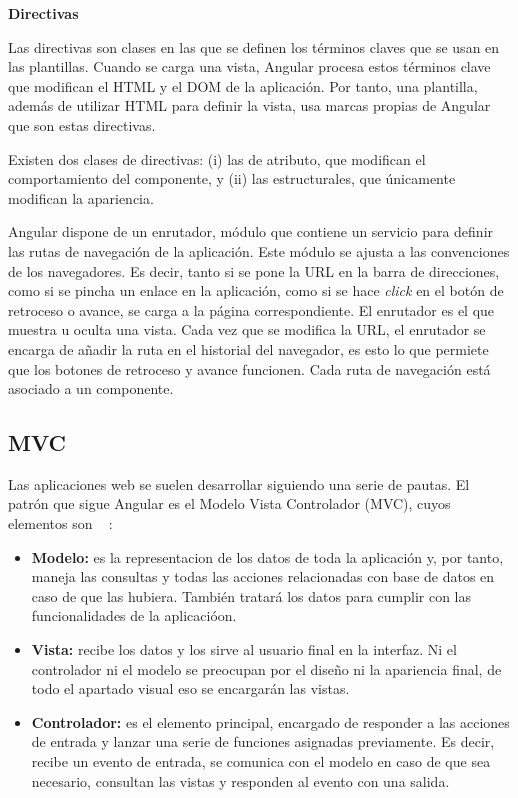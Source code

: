 \documentclass[a4paper, 12pt]{book}
\begin{document}
\textbf{Directivas}

Las directivas son clases en las que se definen los términos claves que se usan en las plantillas. Cuando se carga una vista, Angular procesa estos términos clave que modifican el HTML y el DOM de la aplicación. Por tanto, una plantilla, además de utilizar HTML para definir la vista, usa marcas propias de Angular que son estas directivas. 

Existen dos clases de directivas: (i) las de atributo, que modifican el comportamiento del componente, y (ii) las estructurales, que únicamente modifican la apariencia. 

Angular dispone de un enrutador, módulo que contiene un servicio para definir las rutas de navegación de la aplicación. Este módulo se ajusta a las convenciones de los navegadores. Es decir, tanto si se pone la URL en la barra de direcciones, como si se pincha un enlace en la aplicación, como si se hace \emph{click} en el botón de retroceso o avance, se carga a la página correspondiente. El enrutador es el que muestra u oculta una vista. Cada vez que se modifica la URL, el enrutador se encarga de añadir la ruta en el historial del navegador, es esto lo que permiete que los botones de retroceso y avance funcionen. Cada ruta de navegación está asociado a un componente. 

\subsection{MVC} 
\label{sec:mvc}

Las aplicaciones web se suelen desarrollar siguiendo una serie de pautas. El patrón que sigue Angular es el Modelo Vista Controlador (MVC), cuyos elementos son ~\cite{mvc} :

\begin{itemize}
  
  \item \textbf{Modelo:} es la representacion de los datos de toda la aplicación y, por tanto, maneja las consultas y todas las acciones relacionadas con base de datos en caso de que las hubiera. También tratará los datos para cumplir con las funcionalidades de la aplicacióon.
 
  \item \textbf{Vista:} recibe los datos y los sirve al usuario final en la interfaz. Ni el controlador ni el modelo se preocupan por el diseño ni la apariencia final, de todo el apartado visual eso se encargarán las vistas.

  \item \textbf{Controlador:} es el elemento principal, encargado de responder a las acciones de entrada y lanzar una serie de funciones asignadas previamente. Es decir, recibe un evento de entrada, se comunica con el modelo en caso de que sea necesario, consultan las vistas y responden al evento con una salida.

\end{itemize}
\end{document}

